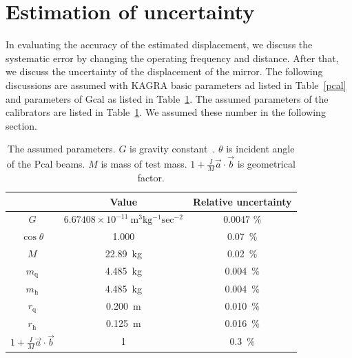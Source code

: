 \documentclass[%
 reprint,
superscriptaddress,
 amsmath,amssymb,
 aps,
]{revtex4-1}
\begin{document}
\section{Estimation of uncertainty} \label{sec:EST}
In evaluating the accuracy of the estimated displacement, we discuss the systematic error by changing the operating frequency and distance. After that, we discuss the uncertainty of the displacement of the mirror. 
The following discussions are assumed with KAGRA basic parameters ad listed in Table~\ref{pcal} and parameters of Gcal as listed in Table~\ref{sus}. The assumed parameters of the calibrators are listed in Table~\ref{sus}. We assumed these number in the following section.

\begin{table}
\begin{center}
\caption{\label{sus}The assumed parameters. $G$ is gravity constant~\cite{RevModPhys.88.035009}. $\theta$ is incident angle of the Pcal beams. $M$ is mass of test mass. $1+\frac{I}{M}\vec{a}\cdot \vec{b}$ is geometrical factor.}
\footnotesize
\begin{tabular}{ccc}
\hline
&Value&Relative uncertainty \\
\hline
$G$&$6.67408 \times 10^{-11}~\mathrm{m^3kg^{-1}sec^{-2}}$&0.0047 \%\\
$\cos{\theta}$ &1.000& 0.07~\%\\
$M$ &22.89~kg & 0.02~\%\\
$m_{\mathrm{q}}$&4.485~kg & 0.004~\%\\
$m_{\mathrm{h}}$& 4.485~kg &0.004~\%\\
$r_{\mathrm{q}}$&0.200~m & 0.010~\%\\
$r_{\mathrm{h}}$& 0.125~m & 0.016~\%\\
$1+\frac{I}{M}\vec{a}\cdot \vec{b}$& 1&0.3~\% \\
\hline
\end{tabular}\\
\end{center}
\end{table}
\end{document}
